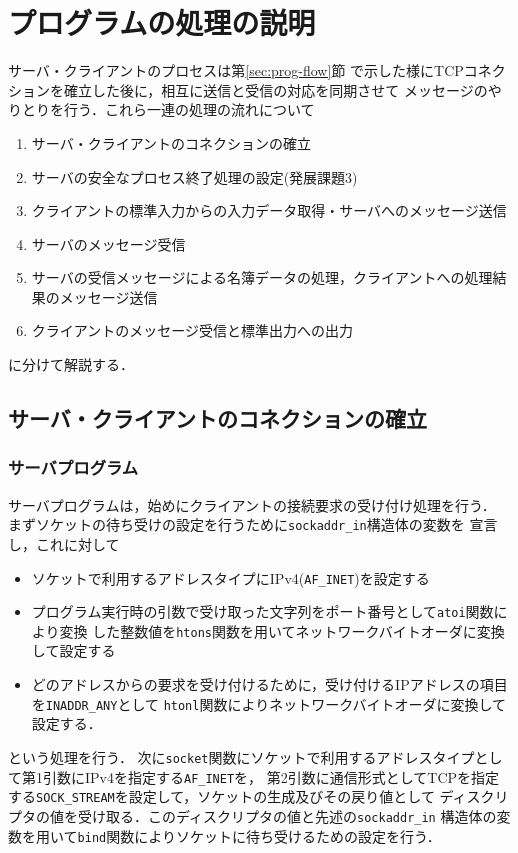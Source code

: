\section{プログラムの処理の説明}
サーバ・クライアントのプロセスは第\ref{sec:prog-flow}節
で示した様にTCPコネクションを確立した後に，相互に送信と受信の対応を同期させて
メッセージのやりとりを行う．これら一連の処理の流れについて
\begin{enumerate}
  \item サーバ・クライアントのコネクションの確立
  \item サーバの安全なプロセス終了処理の設定(発展課題3)
  \item クライアントの標準入力からの入力データ取得・サーバへのメッセージ送信
  \item サーバのメッセージ受信
  \item サーバの受信メッセージによる名簿データの処理，クライアントへの処理結果のメッセージ送信
  \item クライアントのメッセージ受信と標準出力への出力
\end{enumerate}
に分けて解説する．

\subsection{サーバ・クライアントのコネクションの確立}
\subsubsection{サーバプログラム} \label{sec:prog-server}
サーバプログラムは，始めにクライアントの接続要求の受け付け処理を行う．
まずソケットの待ち受けの設定を行うために\verb|sockaddr_in|構造体の変数を
宣言し，これに対して
\begin{itemize}
  \item ソケットで利用するアドレスタイプにIPv4(\verb|AF_INET|)を設定する
  \item プログラム実行時の引数で受け取った文字列をポート番号として\verb|atoi|関数により変換
  した整数値を\verb|htons|関数を用いてネットワークバイトオーダに変換して設定する
  \item どのアドレスからの要求を受け付けるために，受け付けるIPアドレスの項目を\verb|INADDR_ANY|として
  \verb|htonl|関数によりネットワークバイトオーダに変換して設定する．
\end{itemize}
という処理を行う．
次に\verb|socket|関数にソケットで利用するアドレスタイプとして第1引数にIPv4を指定する\verb|AF_INET|を，
第2引数に通信形式としてTCPを指定する\verb|SOCK_STREAM|を設定して，ソケットの生成及びその戻り値として
ディスクリプタの値を受け取る．このディスクリプタの値と先述の\verb|sockaddr_in|
構造体の変数を用いて\verb|bind|関数によりソケットに待ち受けるための設定を行う．

